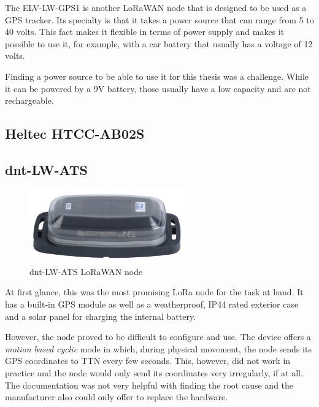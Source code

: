 The ELV-LW-GPS1 is another \ac{LoRaWAN} node that is designed to be used as a \ac{GPS} tracker.
Its specialty is that it takes a power source that can range from 5 to 40 volts.
This fact makes it flexible in terms of power supply and makes it possible to use it, for example, with a car battery that usually has a voltage of 12 volts.

Finding a power source to be able to use it for this thesis was a challenge.
While it can be powered by a 9V battery, those usually have a low capacity and are not rechargeable.



\subsection{Heltec HTCC-AB02S}


\subsection{dnt-LW-ATS}

\begin{figure}[h]
    \centering
    \includegraphics[width=0.6\textwidth]{pictures/hardware/gps-nodes/dnt-LW-ATS.jpg}
    \caption{dnt-LW-ATS \ac{LoRaWAN} node~\protect\cite{dnt_gmbh_dnt_nodate}}
\end{figure}

At first glance, this was the most promising \ac{LoRa} node for the task at hand.
It has a built-in \ac{GPS} module as well as a weatherproof, IP44 rated exterior case and a solar panel for charging the internal battery.

However, the node proved to be difficult to configure and use.
The device offers a \emph{motion based cyclic} mode in which, during physical movement, the node sends its \ac{GPS} coordinates to \ac{TTN} every few seconds.
This, however, did not work in practice and the node would only send its coordinates very irregularly, if at all.
The documentation was not very helpful with finding the root cause and the manufacturer also could only offer to replace the hardware.

